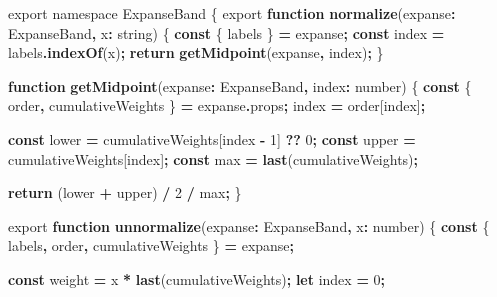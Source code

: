 \documentclass[
  openany]{book}
\newenvironment{Shaded}{\begin{snugshade}}{\end{snugshade}}
\newcommand{\AttributeTok}[1]{\textcolor[rgb]{0.13,0.29,0.53}{#1}}
\newcommand{\ControlFlowTok}[1]{\textcolor[rgb]{0.13,0.29,0.53}{\textbf{#1}}}
\newcommand{\DataTypeTok}[1]{\textcolor[rgb]{0.13,0.29,0.53}{#1}}
\newcommand{\DecValTok}[1]{\textcolor[rgb]{0.00,0.00,0.81}{#1}}
\newcommand{\FunctionTok}[1]{\textcolor[rgb]{0.13,0.29,0.53}{\textbf{#1}}}
\newcommand{\ImportTok}[1]{#1}
\newcommand{\KeywordTok}[1]{\textcolor[rgb]{0.13,0.29,0.53}{\textbf{#1}}}
\newcommand{\NormalTok}[1]{#1}
\newcommand{\OperatorTok}[1]{\textcolor[rgb]{0.81,0.36,0.00}{\textbf{#1}}}
\theoremstyle{definition}
\theoremstyle{definition}
\theoremstyle{definition}
\theoremstyle{definition}
\theoremstyle{remark}
\begin{document}
\begin{Shaded}
\begin{Highlighting}[]
\ImportTok{export} \ImportTok{namespace} \DataTypeTok{ExpanseBand}\NormalTok{ \{}
  \ImportTok{export} \KeywordTok{function} \FunctionTok{normalize}\NormalTok{(expanse}\OperatorTok{:}\NormalTok{ ExpanseBand}\OperatorTok{,}\NormalTok{ x}\OperatorTok{:} \DataTypeTok{string}\NormalTok{) \{}
    \KeywordTok{const}\NormalTok{ \{ labels \} }\OperatorTok{=}\NormalTok{ expanse}\OperatorTok{;}
    \KeywordTok{const}\NormalTok{ index }\OperatorTok{=}\NormalTok{ labels}\OperatorTok{.}\FunctionTok{indexOf}\NormalTok{(x)}\OperatorTok{;}
    \ControlFlowTok{return} \FunctionTok{getMidpoint}\NormalTok{(expanse}\OperatorTok{,}\NormalTok{ index)}\OperatorTok{;}
\NormalTok{  \}}
  
  \KeywordTok{function} \FunctionTok{getMidpoint}\NormalTok{(expanse}\OperatorTok{:}\NormalTok{ ExpanseBand}\OperatorTok{,}\NormalTok{ index}\OperatorTok{:} \DataTypeTok{number}\NormalTok{) \{}
    \KeywordTok{const}\NormalTok{ \{ order}\OperatorTok{,}\NormalTok{ cumulativeWeights \} }\OperatorTok{=}\NormalTok{ expanse}\OperatorTok{.}\AttributeTok{props}\OperatorTok{;}
\NormalTok{    index }\OperatorTok{=}\NormalTok{ order[index]}\OperatorTok{;}

    \KeywordTok{const}\NormalTok{ lower }\OperatorTok{=}\NormalTok{ cumulativeWeights[index }\OperatorTok{{-}} \DecValTok{1}\NormalTok{] }\OperatorTok{??} \DecValTok{0}\OperatorTok{;}
    \KeywordTok{const}\NormalTok{ upper }\OperatorTok{=}\NormalTok{ cumulativeWeights[index]}\OperatorTok{;}
    \KeywordTok{const}\NormalTok{ max }\OperatorTok{=} \FunctionTok{last}\NormalTok{(cumulativeWeights)}\OperatorTok{;}

    \ControlFlowTok{return}\NormalTok{ (lower }\OperatorTok{+}\NormalTok{ upper) }\OperatorTok{/} \DecValTok{2} \OperatorTok{/}\NormalTok{ max}\OperatorTok{;}
\NormalTok{  \}}

  \ImportTok{export} \KeywordTok{function} \FunctionTok{unnormalize}\NormalTok{(expanse}\OperatorTok{:}\NormalTok{ ExpanseBand}\OperatorTok{,}\NormalTok{ x}\OperatorTok{:} \DataTypeTok{number}\NormalTok{) \{}
    \KeywordTok{const}\NormalTok{ \{ labels}\OperatorTok{,}\NormalTok{ order}\OperatorTok{,}\NormalTok{ cumulativeWeights \} }\OperatorTok{=}\NormalTok{ expanse}\OperatorTok{;}

    \KeywordTok{const}\NormalTok{ weight }\OperatorTok{=}\NormalTok{ x }\OperatorTok{*} \FunctionTok{last}\NormalTok{(cumulativeWeights)}\OperatorTok{;}
    \KeywordTok{let}\NormalTok{ index }\OperatorTok{=} \DecValTok{0}\OperatorTok{;}


\end{Highlighting}
\end{Shaded}
\end{document}

